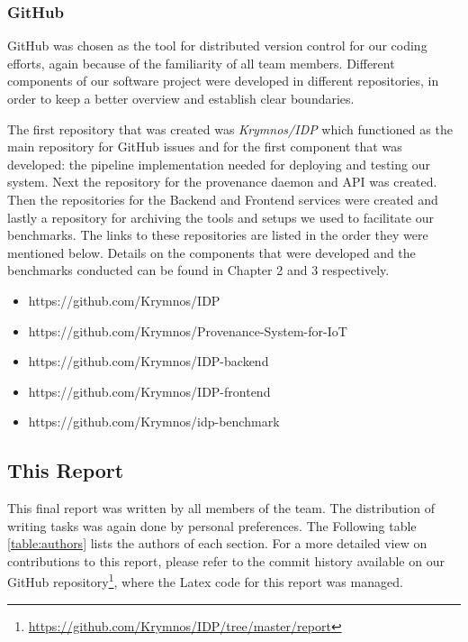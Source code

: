 \subsubsection{GitHub}

GitHub was chosen as the tool for distributed version control for our coding efforts, again because of the familiarity of all team members.
Different components of our software project were developed in different repositories, in order to keep a better overview and establish clear boundaries.

The first repository that was created was \emph{Krymnos/IDP} which functioned as the main repository for GitHub issues and for the first component that was developed: the pipeline implementation needed for deploying and testing our system.
Next the repository for the provenance daemon and API was created.
Then the repositories for the Backend and Frontend services were created and lastly a repository for archiving the tools and setups we used to facilitate our benchmarks.
The links to these repositories are listed in the order they were mentioned below. Details on the components that were developed and the benchmarks conducted can be found in Chapter 2 and 3 respectively.

\begin{itemize}
  \item https://github.com/Krymnos/IDP
  \item https://github.com/Krymnos/Provenance-System-for-IoT
  \item https://github.com/Krymnos/IDP-backend
  \item https://github.com/Krymnos/IDP-frontend
  \item https://github.com/Krymnos/idp-benchmark
\end{itemize}

\subsection{This Report}

This final report was written by all members of the team. 
The distribution of writing tasks was again done by personal preferences. 
The Following table \ref{table:authors} lists the authors of each section.
For a more detailed view on contributions to this report, please refer to the commit history available on our GitHub repository\footnote{\url{https://github.com/Krymnos/IDP/tree/master/report}}, where the Latex code for this report was managed.

